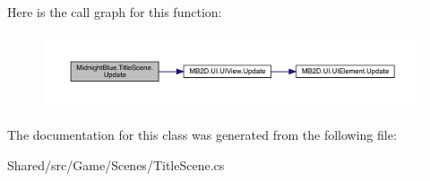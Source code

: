 Here is the call graph for this function\+:\nopagebreak
\begin{figure}[H]
\begin{center}
\leavevmode
\includegraphics[width=350pt]{class_midnight_blue_1_1_title_scene_a4052b2a261434462cd0150e2f4da3c5b_cgraph}
\end{center}
\end{figure}


The documentation for this class was generated from the following file\+:\begin{DoxyCompactItemize}
\item 
Shared/src/\+Game/\+Scenes/Title\+Scene.\+cs\end{DoxyCompactItemize}
